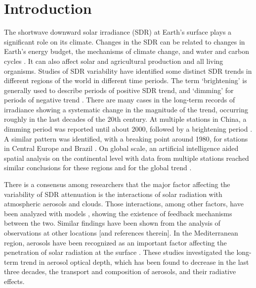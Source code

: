\documentclass[applsci,article,submit,moreauthors,pdftex]{Definitions/mdpi}
\begin{document}

\vspace{+6pt}

\hypertarget{introduction}{%
\section{Introduction}\label{introduction}}

The shortwave downward solar irradiance (SDR) at Earth's surface plays a
significant role on its climate. Changes in the SDR can be related to
changes in Earth's energy budget, the mechanisms of climate change, and
water and carbon cycles \citep{Wild2009}. It can also affect solar and
agricultural production and all living organisms. Studies of SDR
variability have identified some distinct SDR trends in different
regions of the world in different time periods. The term `brightening'
is generally used to describe periods of positive SDR trend, and
`dimming' for periods of negative trend \citep{Wild2009}. There are many
cases in the long-term records of irradiance showing a systematic change
in the magnitude of the trend, occurring roughly in the last decades of
the 20th century. At multiple stations in China, a dimming period was
reported until about 2000, followed by a brightening period
\citep{Yang2021}. A similar pattern was identified, with a breaking
point around 1980, for stations in Central Europe \citep{Wild2021} and
Brazil \citep{Yamasoe2021}. On global scale, an artificial intelligence
aided spatial analysis on the continental level with data from multiple
stations reached similar conclusions for these regions and for the
global trend \citep{Yuan2021}.

There is a consensus among researchers that the major factor affecting
the variability of SDR attenuation is the interactions of solar
radiation with atmospheric aerosols and clouds. Those interactions,
among other factors, have been analyzed with models
\citep{Li2016, Samset2018}, showing the existence of feedback mechanisms
between the two. Similar findings have been shown from the analysis of
observations at other locations
\citep{Schwarz2020, Ohvril2009, Zerefos2009, Xia2007} {[}and references
therein{]}. In the Mediterranean region, aerosols have been recognized
as an important factor affecting the penetration of solar radiation at
the surface
\citep{Fountoulakis2016, Siomos2018, Gkikas2013, Lozano2021}. These
studies investigated the long-term trend in aerosol optical depth, which
has been found to decrease in the last three decades, the transport and
composition of aerosols, and their radiative effects.
\end{document}
